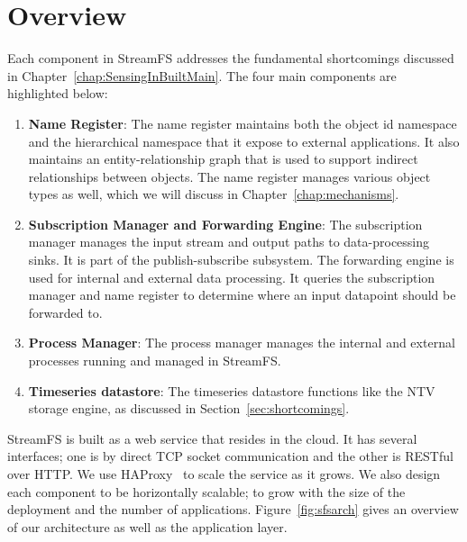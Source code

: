 \section{Overview}
Each component in StreamFS addresses the fundamental shortcomings discussed in Chapter~\ref{chap:SensingInBuiltMain}.
The four main components are highlighted below:

\begin{enumerate}

\item \textbf{Name Register}: The name register maintains both the object id namespace and the hierarchical namespace
that it expose to external applications.  It also maintains an entity-relationship graph that is used to support
indirect relationships between objects.  The name register manages various object types as well, which we will discuss
in Chapter~\ref{chap:mechanisms}.

\item \textbf{Subscription Manager and Forwarding Engine}: The subscription manager manages the input stream and output
paths to data-processing sinks.  It is part of the publish-subscribe subsystem.  The forwarding engine is used for internal 
and external data processing.  It queries the
subscription manager and name register to determine where an input datapoint should be forwarded to.

\item \textbf{Process Manager}: The process manager manages the internal and external processes running and managed in StreamFS.

\item \textbf{Timeseries datastore}: The timeseries datastore functions like the NTV storage engine, as discussed in 
Section~\ref{sec:shortcomings}.

\end{enumerate}

StreamFS is built as a web service that resides in the cloud.  It has several interfaces; one is by direct TCP socket communication and 
the other is RESTful~\cite{rest} over HTTP.  We use HAProxy~\cite{haproxy} to scale the service as it grows.  We also design each component
to be horizontally scalable; to grow with the size of the deployment and the number of applications.
Figure~\ref{fig:sfsarch} gives an overview of our architecture as well as the application layer.














